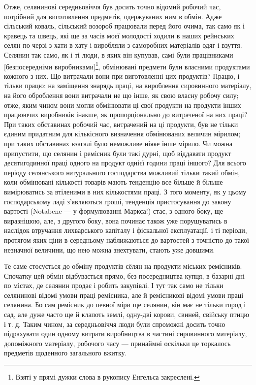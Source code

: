 Отже, селянинові середньовіччя був досить точно відомий робочий час, потрібний для виготовлення предметів, одержуваних ним в
обмін. Адже сільський коваль, сільський возороб працювали перед його очима, так само як і кравець та швець, які ще за часів
моєї молодості ходили в наших рейнських селян по черзі з хати в хату і виробляли з саморобних матеріалів одяг і взуття.
Селянин так само, як і ті люди, в яких він купував, самі були працівниками [безпосередніми виробниками]\footnote*{Взяті у прямі дужки слова в рукопису Енгельса закреслені.}, обмінювані
предмети були власними продуктами кожного з них. Що витрачали вони при виготовленні цих продуктів? Працю, і тільки працю: на
заміщення знарядь праці, на вироблення сировинного матеріалу, на його оброблення вони витрачали не що інше, як свою власну
робочу силу; отже, яким чином вони могли обмінювати ці свої продукти на продукти інших працюючих виробників інакше, як
пропорціонально до витраченої на них праці?  При таких обставинах робочий час, витрачений на ці продукти, був не тільки
єдиним придатним для кількісного визначення обмінюваних величин мірилом; при таких обставинах взагалі було неможливе ніяке
інше мірило. Чи можна припустити, що селянин і ремісник були такі дурні, щоб віддавати продукт десятигодинної праці одного
на продукт однієї години праці іншого? Для всього періоду селянського натурального господарства можливий тільки такий
обмін, коли обмінювані кількості товарів мають тенденцію все більше й більше вимірюватись за втіленими в них кількостями
праці. З того моменту, як у цьому господарському ладі з’являються гроші, тенденція пристосування до закону вартості
(Notabene — у формулюванні Маркса!) стає, з одного боку, ще виразнішою, але, з другого боку, вона починає також уже
порушуватись в наслідок втручання лихварського капіталу і фіскальної експлуатації, і ті періоди, протягом яких ціни в
середньому наближаються до вартостей з точністю до такої незначної величини, що нею можна знехтувати, стають уже довшими.

Те саме стосується до обміну продуктів сёлян на продукти міських ремісників. Спочатку цей обмін відбувається прямо, без
посередництва купця, в базарні дні по містах, де селянин продає і робить закупівлі. І тут так само не тільки селянинові
відомі умови праці ремісника, але й ремісникові відомі умови праці селянина. Бо сам ремісник до певної міри ще селянин, він
має не тільки город і сад, але дуже часто ще й клапоть землі, одну-дві корови, свиней, свійську птицю і т. д. Таким чином,
за середньовіччя люди були спроможні досить точно підрахувати один одному витрати виробництва в частині сировинного
матеріалу, допоміжного матеріалу, робочого часу — принаймні оскільки це торкалось предметів щоденного загального вжитку.
